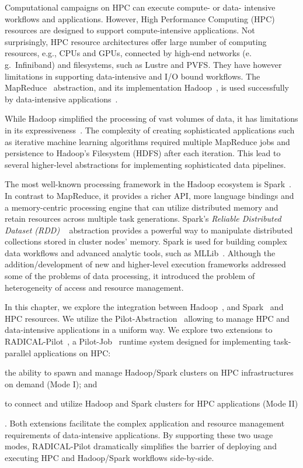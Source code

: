 \label{ch:pilot-data-hadoop}

Computational campaigns on HPC can execute compute- or data- intensive workflows and applications.
However, High Performance Computing (HPC) resources are designed to support compute-intensive applications.
Not surprisingly, HPC resource architectures offer large number of computing resources, e.g., CPUs and GPUs, connected by high-end networks (e.\,g.\ Infiniband) and filesystems, such as Lustre and PVFS.
They have however limitations in supporting data-intensive and I/O bound workflows.
The MapReduce~\cite{dean2004mapreduce} abstraction, and its implementation Hadoop~\cite{hadoop}, is used successfully by data-intensive applications~\cite{hellerstein2012science}.

While Hadoop simplified the processing of vast volumes of data, it has limitations in its expressiveness~\cite{yelick2011magellan,isard2007dryad}.
The complexity of creating sophisticated applications such as iterative machine learning algorithms required multiple MapReduce jobs and persistence to Hadoop's Filesystem (HDFS) after each iteration.
This lead to several higher-level abstractions for implementing sophisticated data pipelines.

The most well-known processing framework in the Hadoop ecosystem is Spark~\cite{zaharia2010spark}.
In contrast to MapReduce, it provides a richer API, more language bindings and a memory-centric processing engine that can utilize distributed memory and retain resources across multiple task generations.
Spark's \emph{Reliable Distributed Dataset (RDD)} ~\cite{zaharia2012resilient} abstraction provides a powerful way to manipulate distributed collections stored in cluster nodes' memory.
Spark is used for building complex data workflows and advanced analytic tools, such as MLLib~\cite{mllib}.
Although the addition/development of new and higher-level execution frameworks addressed some of the problems of data processing, it introduced the problem of heterogeneity of access and resource management.

In this chapter, we explore the integration between Hadoop~\cite{hadoop}, and Spark~\cite{zaharia2010spark} and HPC resources.
We utilize the Pilot-Abstraction~\cite{luckow2012pstar} allowing to manage HPC and data-intensive applications in a uniform way.
We explore two extensions to RADICAL-Pilot~\cite{merzky2018design}, a Pilot-Job~\cite{luckow2012pstar} runtime system designed for implementing task-parallel applications on HPC: 
\begin{inparaenum}[1)]
    \item the ability to spawn and manage Hadoop/Spark clusters on HPC infrastructures on demand (Mode I); and
    \item to connect and utilize Hadoop and Spark clusters for HPC applications (Mode II)
\end{inparaenum}.
Both extensions facilitate the complex application and resource management requirements of data-intensive applications.
By supporting these two usage modes, RADICAL-Pilot dramatically simplifies the barrier of deploying and executing HPC and Hadoop/Spark workflows side-by-side.

